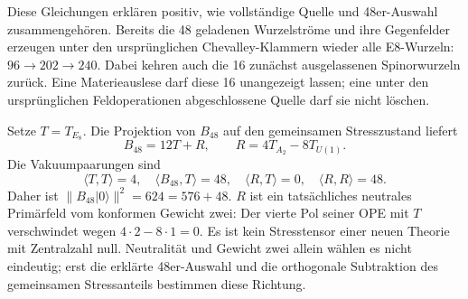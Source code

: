 Diese Gleichungen erklären positiv, wie vollständige Quelle und 48er-Auswahl zusammengehören. Bereits die 48 geladenen Wurzelströme und ihre Gegenfelder erzeugen unter den ursprünglichen Chevalley-Klammern wieder alle E8-Wurzeln: $96\to202\to240$. Dabei kehren auch die 16 zunächst ausgelassenen Spinorwurzeln zurück. Eine Materieauslese darf diese 16 unangezeigt lassen; eine unter den ursprünglichen Feldoperationen abgeschlossene Quelle darf sie nicht löschen.

Setze $T=T_{E_8}$. Die Projektion von $B_{48}$ auf den gemeinsamen Stresszustand liefert
\begin{equation}\label{eq:nativeresidual}
\boxed{B_{48}=12T+R,\qquad R=4T_{A_2}-8T_{U(1)}.}
\end{equation}
Die Vakuumpaarungen sind
\begin{equation}
\langle T,T\rangle=4,\quad
\langle B_{48},T\rangle=48,\quad
\langle R,T\rangle=0,\quad
\boxed{\langle R,R\rangle=48.}
\end{equation}
Daher ist $\|B_{48}|0\rangle\|^2=624=576+48$.
$R$ ist ein tatsächliches neutrales Primärfeld vom konformen Gewicht zwei: Der vierte Pol seiner OPE mit $T$ verschwindet wegen $4\cdot2-8\cdot1=0$. Es ist kein Stresstensor einer neuen Theorie mit Zentralzahl null. Neutralität und Gewicht zwei allein wählen es nicht eindeutig; erst die erklärte 48er-Auswahl und die orthogonale Subtraktion des gemeinsamen Stressanteils bestimmen diese Richtung.


